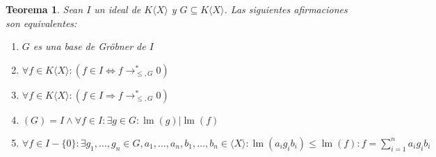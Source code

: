 \documentclass{report}
\theoremstyle{customstyle}
\newtheorem{theorem}{Teorema}[chapter]
\theoremstyle{factstyle}
\DeclareMathOperator{\lm}{lm}
\begin{document}
\begin{theorem}\label{thm:equivalencias de base de Gröbner}
  Sean $I$ un ideal de $K⟨X⟩$ y $G ⊆ K⟨X⟩$. Las siguientes afirmaciones son equivalentes:
  \begin{enumerate}
    \item $G$ es una base de Gröbner de $I$

    \item $∀f ∈ K⟨X⟩ : (f ∈ I ⇔ f →^*_{≤, G} 0)$

    \item $∀f ∈ K⟨X⟩ : (f ∈ I ⇒ f →^*_{≤, G} 0)$

    \item $(G) = I ∧ ∀f ∈ I : ∃g ∈ G : \lm(g) | \lm(f)$

    \item $∀f ∈ I - \{0\} : ∃g_1, …, g_n ∈ G, a_1, …, a_n, b_1, …, b_n ∈ ⟨X⟩ : \lm(a_i g_i b_i) ≤ \lm(f) : f = ∑_{i = 1}^n a_i g_i b_i$
  \end{enumerate}

\end{theorem}
\end{document}
